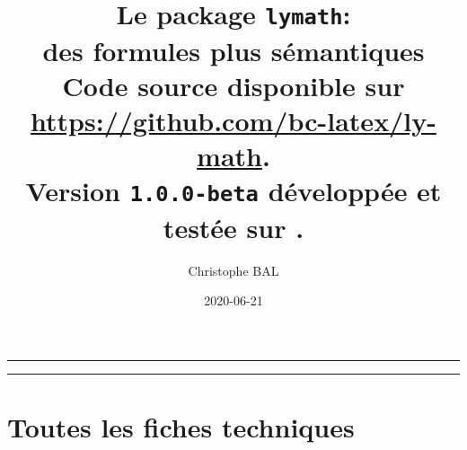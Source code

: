 \documentclass[12pt,a4paper]{article}
\begin{document}
\renewcommand\labelitemi{\raisebox{0.125em}{\tiny\textbullet}}
\renewcommand{\labelitemii}{---}

\title{%
	Le package \texttt{lymath}:\\%
	des formules plus sémantiques\\%
	{\footnotesize Code source disponible sur \url{https://github.com/bc-latex/ly-math}.}\\%
{\footnotesize Version \texttt{1.0.0-beta} développée et testée sur \macosxname{}.}%
}
\author{Christophe BAL}
\date{2020-06-21}

\maketitle


\vspace{2em}

\hrule

\tableofcontents

\vspace{1.5em}

\hrule

\newpage



\newpage
\section{Toutes les fiches techniques} \label{techincal-ids}

\end{document}
